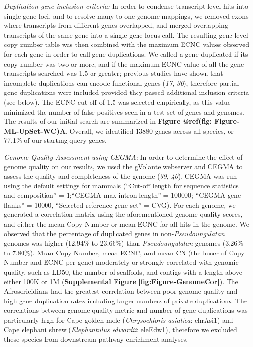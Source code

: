 \documentclass[]{elsarticle} %
\begin{document}
\emph{Duplication gene inclusion criteria:} In order to condense transcript-level hits into single gene loci, and to resolve many-to-one genome mappings, we removed exons where transcripts from different genes overlapped, and merged overlapping transcripts of the same gene into a single gene locus call. The resulting gene-level copy number table was then combined with the maximum ECNC values observed for each gene in order to call gene duplications. We called a gene duplicated if its copy number was two or more, and if the maximum ECNC value of all the gene transcripts searched was 1.5 or greater; previous studies have shown that incomplete duplications can encode functional genes (\emph{17}, \emph{30}), therefore partial gene duplications were included provided they passed additional inclusion criteria (see below). The ECNC cut-off of 1.5 was selected empirically, as this value minimized the number of false positives seen in a test set of genes and genomes. The results of our initial search are summarized in \textbf{Figure @ref(fig: Figure-ML-UpSet-WC)A}. Overall, we identified 13880 genes across all species, or 77.1\% of our starting query genes.

\emph{Genome Quality Assessment using CEGMA:} In order to determine the effect of genome quality on our results, we used the gVolante webserver and CEGMA to assess the quality and completeness of the genome (\emph{39}, \emph{40}). CEGMA was run using the default settings for mammals (``Cut-off length for sequence statistics and composition'' = 1;``CEGMA max intron length'' = 100000; ``CEGMA gene flanks'' = 10000, ``Selected reference gene set'' = CVG). For each genome, we generated a correlation matrix using the aforementioned genome quality scores, and either the mean Copy Number or mean ECNC for all hits in the genome. We observed that the percentage of duplicated genes in non-\emph{Pseudoungulatan} genomes was higher (12.94\% to 23.66\%) than \emph{Pseudoungulatan} genomes (3.26\% to 7.80\%). Mean Copy Number, mean ECNC, and mean CN (the lesser of Copy Number and ECNC per gene) moderately or strongly correlated with genomic quality, such as LD50, the number of scaffolds, and contigs with a length above either 100K or 1M (\textbf{Supplemental Figure \ref{fig:Figure-GenomeCor}}). The Afrosoricidians had the greatest correlation between poor genome quality and high gene duplication rates including larger numbers of private duplications. The correlations between genome quality metric and number of gene duplications was particularly high for Cape golden mole (\emph{Chrysochloris asiatica}: chrAsi1) and Cape elephant shrew (\emph{Elephantulus edwardii}: eleEdw1), therefore we excluded these species from downstream pathway enrichment analyses.
\end{document}
